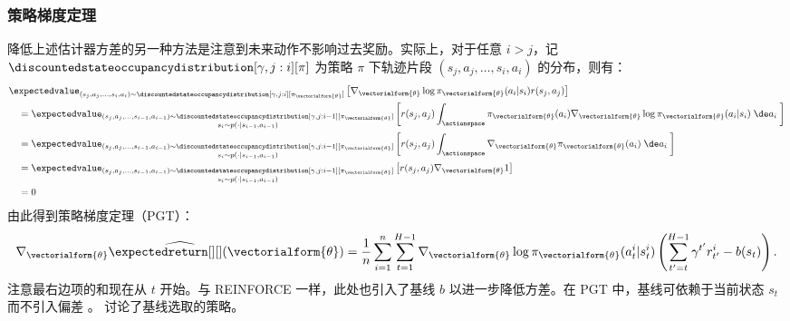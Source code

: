 \subsubsection{策略梯度定理}
降低上述估计器方差的另一种方法是注意到未来动作不影响过去奖励。实际上，对于任意 $i>j$，记 $\discountedstateoccupancydistribution[\gamma,j:i][\pi]$ 为策略 $\pi$ 下轨迹片段 $(s_j,a_j,\dots,s_i,a_{i})$ 的分布，则有：
\begin{align*}
    &\expectedvalue_{(s_j,a_j,\dots,s_i,a_{i})\sim\discountedstateoccupancydistribution[\gamma,j:i][\pi_{\vectorialform{\theta}}]}\left[\nabla_{\vectorialform{\theta}} \log \pi_{\vectorialform{\theta}}(a_i\vert s_i)r(s_{j},a_{j})\right]
    \\&\quad= \expectedvalue_{\substack{(s_j,a_j,\dots,s_{i-1},a_{i-1})\sim\discountedstateoccupancydistribution[\gamma,j:i-1][\pi_{\vectorialform{\theta}}]\\s_i\sim p(\cdot\vert s_{i-1},a_{i-1})}}\left[ r(s_{j},a_{j})\int_{\actionspace}\pi_{\vectorialform{\theta}}(a_i) \nabla_{\vectorialform{\theta}} \log \pi_{\vectorialform{\theta}}(a_i\vert s_i)\;\de a_i\;\right]
    \\&\quad= \expectedvalue_{\substack{(s_j,a_j,\dots,s_{i-1},a_{i-1})\sim\discountedstateoccupancydistribution[\gamma,j:i-1][\pi_{\vectorialform{\theta}}]\\s_i\sim p(\cdot\vert s_{i-1},a_{i-1})}}\left[r(s_{j},a_{j})\int_{\actionspace}\nabla_{\vectorialform{\theta}}\pi_{\vectorialform{\theta}}(a_i) \;\de a_i\; \right]
    \\&\quad= \expectedvalue_{\substack{(s_j,a_j,\dots,s_{i-1},a_{i-1})\sim\discountedstateoccupancydistribution[\gamma,j:i-1][\pi_{\vectorialform{\theta}}]\\s_i\sim p(\cdot\vert s_{i-1},a_{i-1})}}\left[r(s_{j},a_{j})\nabla_{\vectorialform{\theta}}1\right]
    \\&\quad= 0
\end{align*}
由此得到策略梯度定理（PGT）\cite{sutton1999policy}：
\begin{align}
\label{eq:pgt}
    \widehat{\nabla_{\vectorialform{\theta}} \expectedreturn[][](\vectorialform{\theta})} = \frac{1}{n}\sum_{i=1}^{n}\sum_{t=1}^{H-1} \nabla_{\vectorialform{\theta}} \log \pi_{\vectorialform{\theta}}(a_t^i\vert s_t^i)\left(\sum_{t'=t}^{H-1}\gamma^{t'} r_{t'}^i-b(s_t)\right).
\end{align}
注意最右边项的和现在从 $t$ 开始。与 REINFORCE 一样，此处也引入了基线 $b$ 以进一步降低方差。在 PGT 中，基线可依赖于当前状态 $s_t$ 而不引入偏差 \cite{peters2008reinforcement}。\cite{peters2008reinforcement} 讨论了基线选取的策略。

